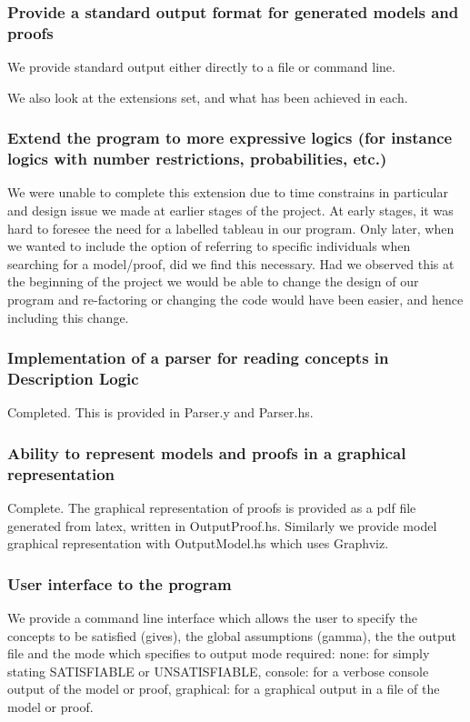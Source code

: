 \subsubsection*{Provide a standard output format for generated models and proofs}
We provide standard output either directly to a file or command line. 

We also look at the extensions set, and what has been achieved in each.

\subsubsection*{Extend the program to more expressive logics (for instance logics with number restrictions, probabilities, etc.) }
We were unable to complete this extension due to time constrains in particular and design issue we made at earlier stages of the project. At early stages, it was hard to foresee the need for a labelled tableau in our program. Only later, when we wanted to include the option of referring to specific individuals when searching for a model/proof, did we find this necessary. Had we observed this at the beginning of the project we would be able to change the design of our program and re-factoring or changing the code would have been easier, and hence including this change. 
\subsubsection*{Implementation of a parser for reading concepts in Description Logic}
Completed. This is provided in Parser.y and Parser.hs. 
\subsubsection*{Ability to represent models and proofs in a graphical representation}
Complete. The graphical representation of proofs is provided as a pdf file generated from latex, written in OutputProof.hs. Similarly we provide model graphical representation with OutputModel.hs which uses Graphviz.
\subsubsection*{User interface to the program}
We provide a command line interface which allows the user to specify the concepts to be satisfied (gives), the global assumptions (gamma), the the output file and the mode which specifies to output mode required:
none: for simply stating SATISFIABLE or UNSATISFIABLE, console: for a verbose console output of the model or proof, graphical: for a graphical output in a file of the model or proof.
